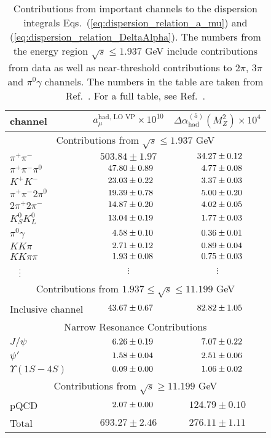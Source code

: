 \begin{table} 
\caption{Contributions from important channels to the 
dispersion integrals Eqs.~(\ref{eq:dispersion_relation_a_mu})
and (\ref{eq:dispersion_relation_DeltaAlpha}).
The numbers from the energy region $\sqrt{s} \leq 1.937$ GeV
include contributions from data as well as near-threshold
contributions to $2\pi$, $3\pi$ and $\pi^0\gamma$ channels.
The numbers in the table are taken from Ref.~\cite{KNT18}.
For a full table, see Ref.~\cite{KNT18}.}
%
\label{table:contributions}
%
\begin{center} \begin{tabular}{|l|c|c|}
\hline
channel        & $a_\mu^{\text{had, LO VP}} \times 10^{10}$
               & $\Delta \alpha_{\text{had}}^{(5)}(M_Z^2)\times 10^4$ \\
\hline
\multicolumn{3}{|c|}{Contributions from $\sqrt{s} \leq 1.937$ GeV} \\
\hline
$\pi^+\pi^-$   & $503.84 \pm 1.97$     & $\hpz34.27 \pm 0.12$ \\
$\pi^+\pi^-\pi^0$
               & $\hpz47.80 \pm 0.89$  & $\hpzz4.77 \pm 0.08$ \\
$K^+ K^-$      & $\hpz23.03 \pm 0.22$  & $\hpzz3.37 \pm 0.03$ \\
$\pi^+ \pi^- 2\pi^0$
               & $\hpz19.39 \pm 0.78$  & $\hpzz5.00 \pm 0.20$ \\
$2\pi^+ 2\pi^-$& $\hpz14.87 \pm 0.20$  & $\hpzz4.02 \pm 0.05$ \\
$K_S^0 K_L^0$  & $\hpz13.04 \pm 0.19$  & $\hpzz1.77 \pm 0.03$ \\
$\pi^0 \gamma$ & $\hpzz4.58 \pm 0.10$  & $\hpzz0.36 \pm 0.01$ \\
$KK\pi$        & $\hpzz2.71 \pm 0.12$  & $\hpzz0.89 \pm 0.04$ \\
$KK\pi\pi$     & $\hpzz1.93 \pm 0.08$  & $\hpzz0.75 \pm 0.03$ \\
$\hpzz\vdots$  &  $\vdots$  &  $\vdots$   \\
\hline 
\multicolumn{3}{|c|}{Contributions from
  $1.937 \leq \sqrt{s} \leq 11.199$ GeV} \\
\hline
Inclusive channel & $\hpz43.67 \pm 0.67$  & $\hpz82.82 \pm 1.05$ \\
\hline
\multicolumn{3}{|c|}{Narrow Resonance Contributions} \\
\hline
$J/\psi$          & $\hpzz6.26 \pm 0.19$  & $\hpzz7.07 \pm 0.22$ \\
$\psi'$           & $\hpzz1.58 \pm 0.04$  & $\hpzz2.51 \pm 0.06$ \\
$\Upsilon(1S-4S)$ & $\hpzz0.09 \pm 0.00$  & $\hpzz1.06 \pm 0.02$ \\
\hline 
\multicolumn{3}{|c|}{Contributions from $\sqrt{s} \geq 11.199$ GeV} \\
\hline
pQCD              & $\hpzz2.07 \pm 0.00$  & $124.79 \pm 0.10$ \\
\hline\hline
Total             & $693.27 \pm 2.46$     & $276.11 \pm 1.11$  \\
\hline
\end{tabular} \end{center} \end{table}


